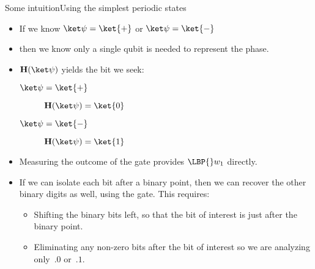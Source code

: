 \begin{frame}{Some intuition}{Using the simplest periodic states}

\begin{itemize}[<+->]
    \item If we know $\QState{}=\ket{+}$ or $\QState{}=\ket{-}$
    \item then we know only a single qubit is needed to represent the phase.
    \item $\Hadamard(\QState{})$ yields the bit we seek:
    \begin{description}
        \item[$\QState{}=\ket{+}$] $\Hadamard(\QState{}) = \ket{0}$
        \item[$\QState{}=\ket{-}$] $\Hadamard(\QState{}) = \ket{1}$
    \end{description}
    \item Measuring the outcome of the \Hadamard{} gate provides $\LBP{}w_{1}$ directly.
    \item If we can isolate each bit after a binary point, then we can recover the other binary digits as well, using the \Hadamard{} gate.  This requires:
    \begin{itemize}
        \item Shifting the binary bits left, so that the bit of interest is just after the binary point.
        \item Eliminating any non-zero bits after the bit of interest so we are analyzing only~$.0$ or~$.1$.
    \end{itemize}
\end{itemize}
    
\end{frame}


